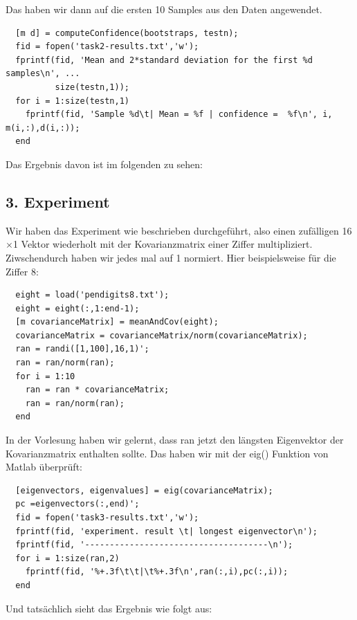 \documentclass{article}
\begin{document}
Das haben wir dann auf die ersten 10 Samples aus den Daten angewendet.
\begin{lstlisting}
  [m d] = computeConfidence(bootstraps, testn);
  fid = fopen('task2-results.txt','w');
  fprintf(fid, 'Mean and 2*standard deviation for the first %d samples\n', ...
          size(testn,1));
  for i = 1:size(testn,1)
    fprintf(fid, 'Sample %d\t| Mean = %f | confidence =  %f\n', i, m(i,:),d(i,:));
  end
\end{lstlisting}
Das Ergebnis davon ist im folgenden zu sehen:
\begin{samepage}

\end{samepage}
\subsection*{3. Experiment}
Wir haben das Experiment wie beschrieben durchgeführt, also einen
zufälligen 16$\times$1 Vektor wiederholt mit der Kovarianzmatrix einer
Ziffer multipliziert. Ziwschendurch haben wir jedes mal auf 1
normiert. Hier beispielsweise für die Ziffer 8:
\begin{lstlisting}
  eight = load('pendigits8.txt');
  eight = eight(:,1:end-1);
  [m covarianceMatrix] = meanAndCov(eight);
  covarianceMatrix = covarianceMatrix/norm(covarianceMatrix);
  ran = randi([1,100],16,1)';
  ran = ran/norm(ran);
  for i = 1:10
    ran = ran * covarianceMatrix;
    ran = ran/norm(ran);
  end
\end{lstlisting}
\begin{samepage}
In der Vorlesung haben wir gelernt, dass ran jetzt den längsten
Eigenvektor der Kovarianzmatrix enthalten sollte. Das haben wir mit
der eig() Funktion von Matlab überprüft:
\begin{lstlisting}
  [eigenvectors, eigenvalues] = eig(covarianceMatrix);
  pc =eigenvectors(:,end)';
  fid = fopen('task3-results.txt','w');
  fprintf(fid, 'experiment. result \t| longest eigenvector\n');
  fprintf(fid, '-------------------------------------\n');
  for i = 1:size(ran,2)
    fprintf(fid, '%+.3f\t\t|\t%+.3f\n',ran(:,i),pc(:,i));
  end
\end{lstlisting}
\end{samepage}
\begin{samepage}
Und tatsächlich sieht das Ergebnis wie folgt aus:

\end{samepage}
\end{document}
